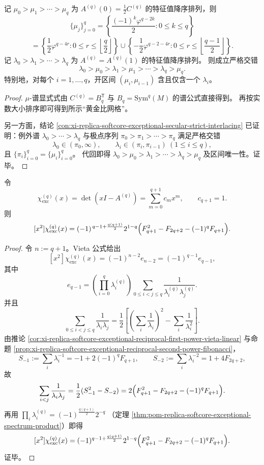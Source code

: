 \begin{theorem}[严格交错与黄金比谱网格夹逼]\label{thm:xi-replica-softcore-exceptional-strict-interlacing-golden-grid}
记 \(\mu_0>\mu_1>\cdots>\mu_q\) 为 \(A^{(q)}(0)=\frac12C^{(q)}\) 的特征值降序排列，则
\[
\{\mu_j\}_{j=0}^{q}
=\left\{\frac{(-1)^k\varphi^{q-2k}}{2}:0\le k\le q\right\}
\]
\[
=\left\{\frac12\varphi^{q-4r}:0\le r\le\left\lfloor\frac q2\right\rfloor\right\}
\cup
\left\{-\frac12\varphi^{q-2-4r}:0\le r\le\left\lfloor\frac{q-1}{2}\right\rfloor\right\}.
\]
记 \(\lambda_0>\lambda_1>\cdots>\lambda_q\) 为 \(A^{(q)}=A^{(q)}(1)\) 的特征值降序排列。
则成立严格交错
\[
\lambda_0>\mu_0>\lambda_1>\mu_1>\cdots>\lambda_q>\mu_q.
\]
特别地，对每个 \(i=1,\dots,q\)，开区间 \((\mu_i,\mu_{i-1})\) 含且仅含一个 \(\lambda_i\)。
\end{theorem}
\begin{proof}
\(\mu\)-谱显式式由 \(C^{(q)}=B_q^{\mathsf T}\) 与 \(B_q=\mathrm{Sym}^q(M)\) 的谱公式直接得到。
再按实数大小排序即可得到所示“黄金比网格”。
\par
另一方面，结论 \ref{con:xi-replica-softcore-exceptional-secular-strict-interlacing}
已证明：例外谱 \(\lambda_0>\cdots>\lambda_q\) 与极点序列
\(
\pi_0>\pi_1>\cdots>\pi_q
\)
满足严格交错
\[
\lambda_0\in(\pi_0,\infty),\qquad
\lambda_i\in(\pi_i,\pi_{i-1})\ (1\le i\le q),
\]
且 \(\{\pi_i\}_{i=0}^{q}=\{\mu_i\}_{i=0}^{q}\)。
代回即得
\(
\lambda_0>\mu_0>\lambda_1>\cdots>\lambda_q>\mu_q
\)
及区间唯一性。证毕。
\end{proof}

\begin{proposition}[例外特征多项式二次项系数闭式]\label{prop:xi-replica-softcore-exceptional-vieta-x2-closed}
令
\[
\chi_{\mathrm{exc}}^{(q)}(x)=\det(xI-A^{(q)})=\sum_{m=0}^{q+1}c_mx^m,\qquad c_{q+1}=1.
\]
则
\[
[x^2]\chi_{\mathrm{exc}}^{(q)}(x)
=(-1)^{\,q-1+\frac{q(q+1)}2}2^{1-q}
\Bigl(F_{q+1}^2-F_{2q+2}-(-1)^qF_{q+1}\Bigr).
\]
\end{proposition}
\begin{proof}
令 \(n:=q+1\)。Vieta 公式给出
\[
[x^2]\chi_{\mathrm{exc}}^{(q)}(x)=(-1)^{n-2}e_{n-2}=(-1)^{q-1}e_{q-1},
\]
其中
\[
e_{q-1}
=\left(\prod_{i=0}^{q}\lambda_i^{(q)}\right)
\sum_{0\le i<j\le q}\frac1{\lambda_i^{(q)}\lambda_j^{(q)}}.
\]
并且
\[
\sum_{0\le i<j\le q}\frac1{\lambda_i\lambda_j}
=\frac12\left[\left(\sum_i\frac1{\lambda_i}\right)^2-\sum_i\frac1{\lambda_i^2}\right].
\]
由推论 \ref{cor:xi-replica-softcore-exceptional-reciprocal-first-power-vieta-linear}
与命题 \ref{prop:xi-replica-softcore-exceptional-reciprocal-second-power-fibonacci}，
\[
S_{-1}:=\sum_i\lambda_i^{-1}=-1+2(-1)^qF_{q+1},\qquad
S_{-2}:=\sum_i\lambda_i^{-2}=1+4F_{2q+2},
\]
故
\[
\sum_{i<j}\frac1{\lambda_i\lambda_j}
=\frac12(S_{-1}^2-S_{-2})
=2\Bigl(F_{q+1}^2-F_{2q+2}-(-1)^qF_{q+1}\Bigr).
\]
再用
\(
\prod_i\lambda_i^{(q)}
=(-1)^{\frac{q(q+1)}2}2^{-q}
\)
（定理 \ref{thm:pom-replica-softcore-exceptional-spectrum-product}）即得
\[
[x^2]\chi_{\mathrm{exc}}^{(q)}(x)
=(-1)^{q-1+\frac{q(q+1)}2}2^{1-q}
\Bigl(F_{q+1}^2-F_{2q+2}-(-1)^qF_{q+1}\Bigr).
\]
证毕。
\end{proof}

